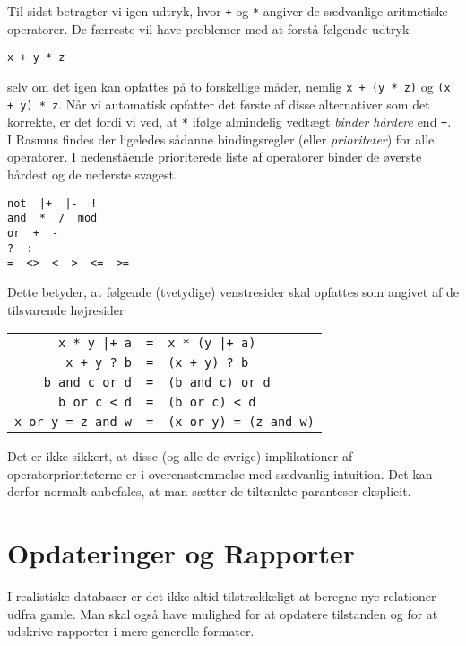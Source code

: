 \documentclass{article}
\newcounter{eks}
\begin{document}
Til sidst betragter vi igen udtryk, hvor \verb"+" og \verb"*" angiver de
s\ae{}dvanlige aritmetiske operatorer. De f\ae{}rreste vil have
problemer med at forst\aa{} f\o{}lgende udtryk
\begin{center}
\verb"x + y * z"
\end{center}
selv om det igen kan opfattes p\aa{} to forskellige m\aa{}der, nemlig
\verb"x + (y * z)" og \verb"(x + y) * z". N\aa{}r vi automatisk opfatter
det f\o{}rste af disse alternativer som det korrekte, er det fordi vi 
ved, at \verb"*" if\o{}lge almindelig vedt\ae{}gt {\em binder h\aa{}rdere\/}
end \verb"+". I {\sc Rasmus} findes der ligeledes s\aa{}danne
bindings\-reg\-ler (eller {\em prioriteter}) 
for alle operatorer. I nedenst\aa{}ende prioriterede
liste af operatorer
binder de \o{}verste h\aa{}rdest og de nederste svagest.
\begin{center}
\verb"not  |+  |-  !"\\
\verb"and  *  /  mod"\\
\verb"or  +  -"\\
\verb"?  :"\\
\verb"=  <>  <  >  <=  >="
\end{center}
Dette betyder, at f\o{}lgende (tvetydige) venstresider skal opfattes som
angivet af de tilsvarende h\o{}jresider
\begin{center}
\begin{tabular}{rcl}
\verb"x * y |+ a" &\verb"="& \verb"x * (y |+ a)"\\
\verb"x + y ? b" &\verb"="& \verb"(x + y) ? b"\\
\verb"b and c or d" &\verb"="& \verb"(b and c) or d"\\
\verb"b or c < d" &\verb"="& \verb"(b or c) < d"\\
\verb"x or y = z and w" &\verb"="& \verb"(x or y) = (z and w)"
\end{tabular}
\end{center}
Det er ikke sikkert, at disse (og alle de \o{}vrige) implikationer
af operatorprioriteterne er i overensstemmelse med s\ae{}dvanlig
intuition. Det kan derfor normalt 
anbefales, at man s\ae{}tter de tilt\ae{}nkte paranteser eksplicit.

\newpage
\section{Opdateringer og Rapporter}
I realistiske databaser er det ikke altid tilstr\ae{}kkeligt
at beregne nye relationer udfra gamle. Man skal ogs\aa{} have mulighed for
at opdatere tilstanden og for at udskrive rapporter i mere generelle
formater.
\end{document}
